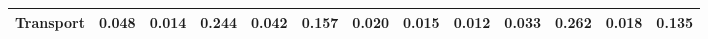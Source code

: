 \begin{table}[htbp]
\begin{tabular}{lcccccccccccc}
  Transport & \textcolor[RGB]{104,68,151}{0.048} & \textcolor[RGB]{197,127,58}{0.014} & \textcolor[RGB]{21,14,234}{0.244} & \textcolor[RGB]{112,72,143}{0.042} & \textcolor[RGB]{34,22,221}{0.157} & \textcolor[RGB]{172,111,83}{0.020} & \textcolor[RGB]{193,125,62}{0.015} & \textcolor[RGB]{205,133,50}{0.012} & \textcolor[RGB]{136,88,119}{0.033} & \textcolor[RGB]{19,13,236}{0.262} & \textcolor[RGB]{184,119,71}{0.018} & \textcolor[RGB]{41,26,214}{0.135} \\ 
   \hline
\end{tabular}
\end{table}
